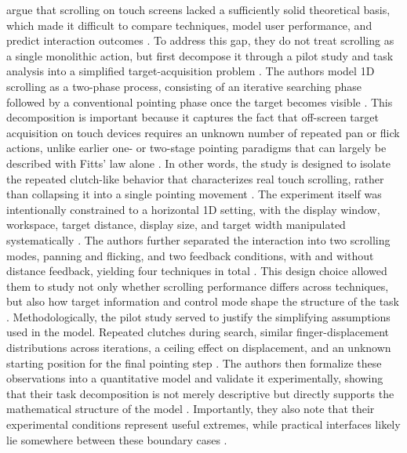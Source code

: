 \documentclass[12pt,a4paper]{report}
\begin{document}
        \citeauthor{zhao2014model} argue that scrolling on touch screens lacked a sufficiently solid theoretical basis, which made it difficult to compare techniques, model user performance, and predict interaction outcomes \cite{zhao2014model}. To address this gap, they do not treat scrolling as a single monolithic action, but first decompose it through a pilot study and task analysis into a simplified target-acquisition problem \cite{zhao2014model}. The authors model 1D scrolling as a two-phase process, consisting of an iterative searching phase followed by a conventional pointing phase once the target becomes visible \cite{zhao2014model}. This decomposition is important because it captures the fact that off-screen target acquisition on touch devices requires an unknown number of repeated pan or flick actions, unlike earlier one- or two-stage pointing paradigms that can largely be described with Fitts' law alone \cite{zhao2014model}. In other words, the study is designed to isolate the repeated clutch-like behavior that characterizes real touch scrolling, rather than collapsing it into a single pointing movement \cite{zhao2014model}. The experiment itself was intentionally constrained to a horizontal 1D setting, with the display window, workspace, target distance, display size, and target width manipulated systematically \cite{zhao2014model}. The authors further separated the interaction into two scrolling modes, panning and flicking, and two feedback conditions, with and without distance feedback, yielding four techniques in total \cite{zhao2014model}. This design choice allowed them to study not only whether scrolling performance differs across techniques, but also how target information and control mode shape the structure of the task \cite{zhao2014model}. Methodologically, the pilot study served to justify the simplifying assumptions used in the model. Repeated clutches during search, similar finger-displacement distributions across iterations, a ceiling effect on displacement, and an unknown starting position for the final pointing step \cite{zhao2014model}. The authors then formalize these observations into a quantitative model and validate it experimentally, showing that their task decomposition is not merely descriptive but directly supports the mathematical structure of the model \cite{zhao2014model}. Importantly, they also note that their experimental conditions represent useful extremes, while practical interfaces likely lie somewhere between these boundary cases \cite{zhao2014model}.
\end{document}
